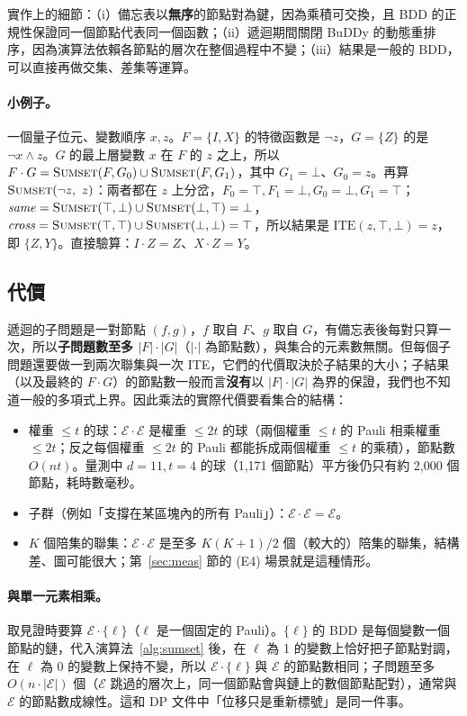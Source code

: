 \documentclass[a4paper,11pt,fontset=none]{ctexart}
\renewcommand{\emph}[1]{\textbf{#1}}
\newcommand{\E}{\mathcal{E}}
\theoremstyle{definition}
\begin{document}
實作上的細節：（i）備忘表以\emph{無序}的節點對為鍵，因為乘積可交換，且 BDD 的正規性保證同一個節點代表同一個函數；（ii）遞迴期間關閉 BuDDy 的動態重排序，因為演算法依賴各節點的層次在整個過程中不變；（iii）結果是一般的 BDD，可以直接再做交集、差集等運算。

\paragraph{小例子。}一個量子位元、變數順序 $x,z$。$F=\{I,X\}$ 的特徵函數是 $\neg z$，$G=\{Z\}$ 的是 $\neg x\wedge z$。$G$ 的最上層變數 $x$ 在 $F$ 的 $z$ 之上，所以 $F\cdot G=\textsc{Sumset}(F,G_0)\cup\textsc{Sumset}(F,G_1)$，其中 $G_1=\bot$、$G_0=z$。再算 $\textsc{Sumset}(\neg z,\ z)$：兩者都在 $z$ 上分岔，$F_0=\top,F_1=\bot,G_0=\bot,G_1=\top$；$\mathit{same}=\textsc{Sumset}(\top,\bot)\cup\textsc{Sumset}(\bot,\top)=\bot$，$\mathit{cross}=\textsc{Sumset}(\top,\top)\cup\textsc{Sumset}(\bot,\bot)=\top$，所以結果是 $\mathrm{ITE}(z,\top,\bot)=z$，即 $\{Z,Y\}$。直接驗算：$I\cdot Z=Z$、$X\cdot Z=Y$。

\subsection{代價}

遞迴的子問題是一對節點 $(f,g)$，$f$ 取自 $F$、$g$ 取自 $G$，有備忘表後每對只算一次，所以\emph{子問題數至多 $\lvert F\rvert\cdot\lvert G\rvert$}（$\lvert\cdot\rvert$ 為節點數），與集合的元素數無關。但每個子問題還要做一到兩次聯集與一次 ITE，它們的代價取決於子結果的大小；子結果（以及最終的 $F\cdot G$）的節點數一般而言\emph{沒有}以 $\lvert F\rvert\cdot\lvert G\rvert$ 為界的保證，我們也不知道一般的多項式上界。因此乘法的實際代價要看集合的結構：
\begin{itemize}[leftmargin=1.5em]
\item 權重 $\le t$ 的球：$\E\cdot\E$ 是權重 $\le 2t$ 的球（兩個權重 $\le t$ 的 Pauli 相乘權重 $\le 2t$；反之每個權重 $\le 2t$ 的 Pauli 都能拆成兩個權重 $\le t$ 的乘積），節點數 $O(nt)$。量測中 $d{=}11,t{=}4$ 的球（1,171 個節點）平方後仍只有約 2,000 個節點，耗時數毫秒。
\item 子群（例如「支撐在某區塊內的所有 Pauli」）：$\E\cdot\E=\E$。
\item $K$ 個陪集的聯集：$\E\cdot\E$ 是至多 $K(K+1)/2$ 個（較大的）陪集的聯集，結構差、圖可能很大；第~\ref{sec:meas} 節的 (E4) 場景就是這種情形。
\end{itemize}

\paragraph{與單一元素相乘。}取見證時要算 $\E\cdot\{\ell\}$（$\ell$ 是一個固定的 Pauli）。$\{\ell\}$ 的 BDD 是每個變數一個節點的鏈，代入演算法~\ref{alg:sumset} 後，在 $\ell$ 為 1 的變數上恰好把子節點對調，在 $\ell$ 為 0 的變數上保持不變，所以 $\E\cdot\{\ell\}$ 與 $\E$ 的節點數相同；子問題至多 $O(n\cdot\lvert\E\rvert)$ 個（$\E$ 跳過的層次上，同一個節點會與鏈上的數個節點配對），通常與 $\E$ 的節點數成線性。這和 DP 文件中「位移只是重新標號」是同一件事。
\end{document}
